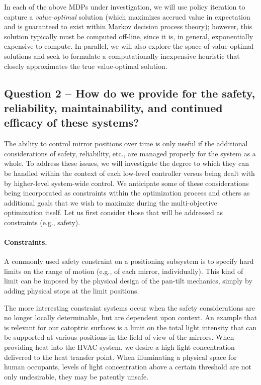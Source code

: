 In each of the above MDPs under investigation, we will use policy iteration
to capture a \emph{value-optimal} solution (which maximizes accrued value in 
expectation and is guaranteed to exist within Markov decision process
theory); however, this solution typically must be computed off-line, since
it is, in general, exponentially expensive to compute.  In parallel, we
will also explore the space of value-optimal solutions and seek to formulate
a computationally inexpensive heuristic that closely approximates the
true value-optimal solution.

\subsection{Question 2 -- How do we provide for the safety, reliability,
maintainability, and continued efficacy of these systems?}

The ability to control mirror positions over time is only useful if the
additional considerations of safety, reliability, etc., are managed
properly for the system as a whole. To address these issues, we will
investigate the degree to which they can be handled within the context
of each low-level controller versus being dealt with by
higher-level system-wide control. We anticipate some of these
considerations being incorporated as constraints within the
optimization process and others as additional goals that we wish to
maximize during the multi-objective optimization itself.  Let us first
consider those that will be addressed as constraints (e.g., safety).

\paragraph{Constraints.}
A commonly used safety constraint on a positioning subsystem is to
specify hard limits on the range of motion (e.g., of each mirror, individually).
This kind of limit can be imposed by the physical design of the pan-tilt
mechanics, simply by adding physical stops at the limit positions.

The more interesting constraint systems occur when the safety considerations
are no longer locally determinable, but are dependent upon context.
An example that is relevant for our catoptric surfaces is a limit on
the total light intensity that can be supported at various positions in the
field of view of the mirrors. When providing heat into the HVAC system,
we desire a high light concentration delivered to the heat transfer point.
When illuminating a physical space for human occupants, levels of light 
concentration above a certain threshold are not only undesirable, they may 
be patently unsafe.

